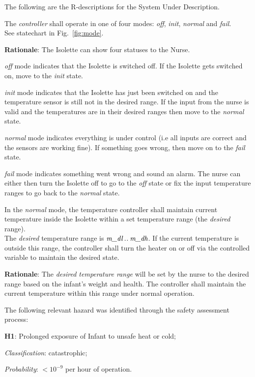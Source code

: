 \documentclass[fontsize=12pt,paper=letter,twoside]{scrartcl}
\begin{document}
The following are the R-descriptions for the System Under Description.

\rdescription
{The \emph{controller} shall operate in one of four modes: \emph{off}, \emph{init}, \emph{normal} and \emph{fail}.\\}
{See statechart in Fig.~\ref{fig:mode}.}
\label{R1}

\smallskip
\noindent \textbf{Rationale}: The Isolette can show four statuses to the Nurse.
\begin{mylist}
\item \emph{off} mode indicates that the Isolette is switched off. If the Isolette gets switched on, move to the \emph{init} state.
\item \emph{init} mode indicates that the Isolette has just been switched on and the temperature sensor is still not in the desired range. If the input from the nurse is valid and the temperatures are in their desired ranges then move to the \emph{normal} state.
\item \emph{normal} mode indicates everything is under control (i.e all inputs are correct and the sensors are working fine). If something goes wrong, then move on to the \emph{fail} state.
\item \emph{fail} mode indicates something went wrong and sound an alarm. The nurse can either then turn the Isolette off to go to the \emph{off} state or fix the input temperature ranges to go back to the \emph{normal} state.
\end{mylist} 

\rdescription
{In the \emph{normal} mode, the temperature controller shall maintain current temperature inside the Isolette within a set temperature range (the \emph{desired} range).\\}
{The \emph{desired} temperature range is $\textit{m\_dl} \mathbin{.\mkern1mu.} \textit{m\_dh}$. If the current temperature  is outside this range, the controller shall turn the heater on or off via the controlled variable  to maintain the desired state.\smallskip}
\label{R2}

\smallskip
\noindent \textbf{Rationale}: The \emph{desired temperature range} will be set by the nurse to the desired range based on the infant's weight and health. The controller shall maintain the current temperature within this range under normal operation.

The following relevant hazard was identified through the safety assessment process:
\begin{mylist}
\item \textbf{H1}: Prolonged exposure of Infant to unsafe heat or cold;
\item \emph{Classification}: catastrophic;
\item \emph{Probability}: $<10^{-9}$ per hour of operation.
\end{mylist}
\end{document}
